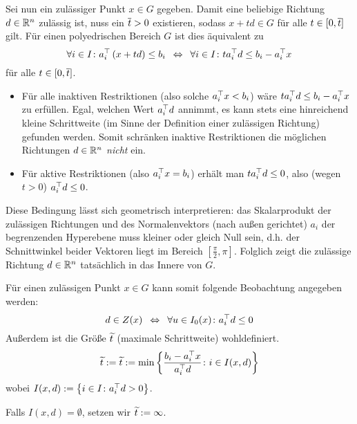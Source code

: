 
Sei nun ein zulässiger Punkt $x \in G$ gegeben. Damit eine beliebige Richtung $d \in \mathbb{R}^n$ zulässig ist, nuss ein $\overline{t} > 0$ existieren, sodass $x + td \in G$ für alle $t \in [0,\overline{t}]$ gilt.
Für einen polyedrischen Bereich $G$ ist dies äquivalent zu
\begin{equation*}
\forall i \in I \colon a_i^{\top} \left( x + td \right) \le b_i \enskip \Leftrightarrow \enskip \forall i \in I \colon t a_i^{\top} d \le b_i - a_i^{\top} x
\end{equation*}
für alle $t \in [0,\overline{t}]$.

\begin{itemize}[nolistsep]%
	\item Für alle inaktiven Restriktionen (also solche $a_i^{\top} x < b_i$) wäre $t a_i^{\top} d \le b_i - a_i^{\top} x$ zu erfüllen. Egal, welchen Wert $a_i^{\top}d$ annimmt, es kann stets eine hinreichend kleine Schrittweite (im Sinne der Definition einer zulässigen Richtung) gefunden werden. Somit schränken inaktive Restriktionen die möglichen Richtungen $d \in \mathbb{R}^n$ \textit{nicht} ein.
	\item Für aktive Restriktionen (also $a_i^{\top} x = b_i$) erhält man $t a_i^{\top} d \le 0$, also (wegen $t > 0$) $a_i^{\top} d \le 0$.
\end{itemize}

Diese Bedingung lässt sich geometrisch interpretieren: 
das Skalarprodukt der zulässigen Richtungen und des Normalenvektors (nach außen gerichtet) $a_i$ der begrenzenden Hyperebene muss kleiner oder gleich Null sein, d.h. der Schnittwinkel beider Vektoren liegt im Bereich $[\frac{\pi}{2},\pi]$. Folglich zeigt die zulässige Richtung $d \in \mathbb{R}^n$ tatsächlich in das Innere von $G$.

Für einen zulässigen Punkt $x \in G$ kann somit folgende Beobachtung angegeben werden:
\begin{equation}
d \in Z(x) \enskip \Leftrightarrow \enskip \forall u \in I_0(x) \colon a_i^{\top}d \le 0 \label{eq: 2.4}
\end{equation}
Außerdem ist die Größe $\widetilde{t}$ (maximale Schrittweite) wohldefiniert.
\begin{equation}
\widetilde{t} \mathrel{:=} \widetilde{t} \mathrel{:=} \min\left\{ \frac{b_i - a_i^{\top}x}{a_i^{\top}d} \colon i \in I(x,d) \right\} \label{eq: 2.5}
\end{equation}
wobei $I(x,d) \mathrel{:=} \left\{  i \in I \colon a_i^{\top}d > 0 \right\}$.

\begin{bemerkung} %
	Falls $I(x,d) = \emptyset$, setzen wir $\widetilde{t} \mathrel{:=} \infty$.
\end{bemerkung}

